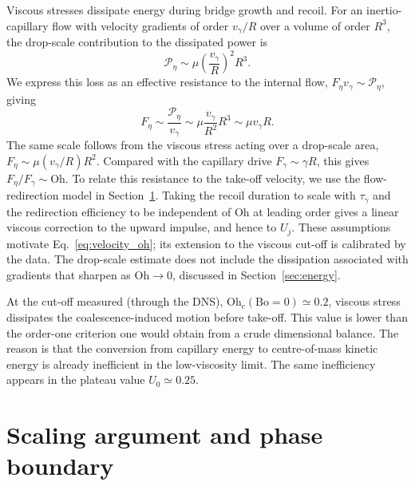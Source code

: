 \documentclass[
reprint,
amsmath,amssymb,
superscriptaddress,
onecolumn,
aps,
prfluids,
longbibliography,
floatfix
]{revtex4-2}
\newcommand{\Oh}{\mathrm{Oh}}
\newcommand{\Bo}{\mathrm{Bo}}
\newcommand{\vgamma}{v_\gamma}
\newcommand{\taugamma}{\tau_\gamma}
\begin{document}
Viscous stresses dissipate energy during bridge growth and recoil. For an inertio-capillary flow with velocity gradients of order $\vgamma/R$ over a volume of order $R^3$, the drop-scale contribution to the dissipated power is
\[
    \mathcal{P}_\eta \sim \mu\left(\frac{\vgamma}{R}\right)^2 R^3.
\]
We express this loss as an effective resistance to the internal flow, $F_\eta\vgamma\sim\mathcal{P}_\eta$, giving
\begin{equation}
    F_\eta \sim \frac{\mathcal{P}_\eta}{\vgamma} \sim \mu \frac{\vgamma}{R^2}R^3 \sim \mu\vgamma R.
    \label{eq:viscous_force}
\end{equation}
The same scale follows from the viscous stress acting over a drop-scale area, $F_\eta\sim\mu(\vgamma/R)R^2$. Compared with the capillary drive $F_\gamma\sim\gamma R$, this gives $F_\eta/F_\gamma\sim\Oh$. To relate this resistance to the take-off velocity, we use the flow-redirection model in Section~\ref{sec:scaling}. Taking the recoil duration to scale with $\taugamma$ and the redirection efficiency to be independent of $\Oh$ at leading order gives a linear viscous correction to the upward impulse, and hence to $U_j$. These assumptions motivate Eq.~\eqref{eq:velocity_oh}; its extension to the viscous cut-off is calibrated by the data. The drop-scale estimate does not include the dissipation associated with gradients that sharpen as $\Oh\to0$, discussed in Section~\ref{sec:energy}.

At the cut-off measured (through the DNS), $\Oh_c(\Bo=0)\simeq0.2$, viscous stress dissipates the coalescence-induced motion before take-off. This value is lower than the order-one criterion one would obtain from a crude dimensional balance. The reason is that the conversion from capillary energy to centre-of-mass kinetic energy is already inefficient in the low-viscosity limit. The same inefficiency appears in the plateau value $U_0\simeq0.25$.

\section{Scaling argument and phase boundary}\label{sec:scaling}
\end{document}
